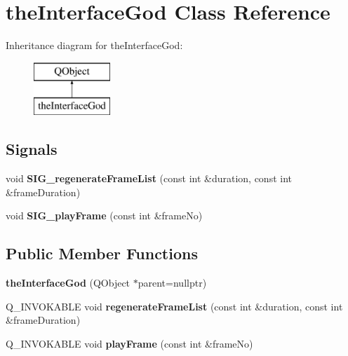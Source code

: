 \hypertarget{classthe_interface_god}{}\section{the\+Interface\+God Class Reference}
\label{classthe_interface_god}
Inheritance diagram for the\+Interface\+God\+:\begin{figure}[H]
\begin{center}
\leavevmode
\includegraphics[height=2.000000cm]{classthe_interface_god}
\end{center}
\end{figure}
\subsection*{Signals}
\begin{DoxyCompactItemize}
\item 
\mbox{\label{classthe_interface_god_a2d28c5450fc8a834749171a0548055e0}} 
void {\bfseries S\+I\+G\+\_\+regenerate\+Frame\+List} (const int \&duration, const int \&frame\+Duration)
\item 
\mbox{\label{classthe_interface_god_a84053294d490359ad575429be4cc6240}} 
void {\bfseries S\+I\+G\+\_\+play\+Frame} (const int \&frame\+No)
\end{DoxyCompactItemize}
\subsection*{Public Member Functions}
\begin{DoxyCompactItemize}
\item 
\mbox{\label{classthe_interface_god_aa59f4c4386a001ae457caec3be6c3f8b}} 
{\bfseries the\+Interface\+God} (Q\+Object $\ast$parent=nullptr)
\item 
\mbox{\label{classthe_interface_god_ab09c9557161f6ddd4fd7aba98df84452}} 
Q\+\_\+\+I\+N\+V\+O\+K\+A\+B\+LE void {\bfseries regenerate\+Frame\+List} (const int \&duration, const int \&frame\+Duration)
\item 
\mbox{\label{classthe_interface_god_a6e96d3eaf1f4589f05177f531df54ffe}} 
Q\+\_\+\+I\+N\+V\+O\+K\+A\+B\+LE void {\bfseries play\+Frame} (const int \&frame\+No)
\end{DoxyCompactItemize}


